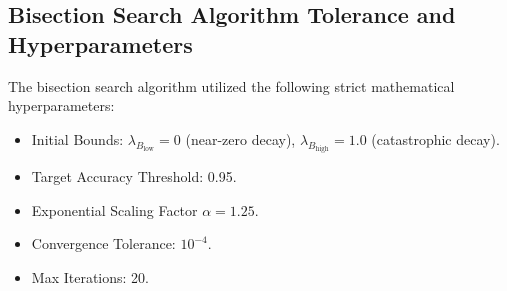 \documentclass[11pt,a4paper]{article}
\newcommand{\bryanCoeff}{\lambda_B}
\begin{document}
\subsection{Bisection Search Algorithm Tolerance and Hyperparameters}
The bisection search algorithm utilized the following strict mathematical hyperparameters:

\begin{itemize}
    \item Initial Bounds: \(\bryanCoeff_{\text{low}} = 0\) (near-zero decay), \(\bryanCoeff_{\text{high}} = 1.0\) (catastrophic decay).
    \item Target Accuracy Threshold: 0.95.
    \item Exponential Scaling Factor \(\alpha = 1.25\).
    \item Convergence Tolerance: \(10^{-4}\).
    \item Max Iterations: 20.
\end{itemize}
\end{document}
